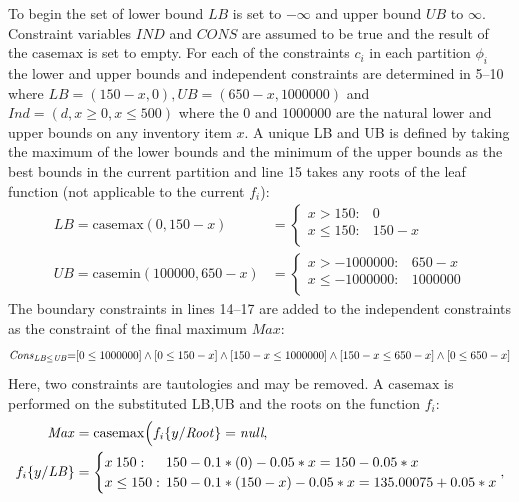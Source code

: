 \documentclass[twoside,11pt]{article}
\newcommand{\casemax}{\mathrm{casemax}}
\newcommand{\casemin}{\mathrm{casemin}}
\newcommand{\UB}{\mathit{UB}}
\newcommand{\LB}{\mathit{LB}}
\newcommand{\IND}{\mathit{Ind}}
\newcommand{\CONS}{\mathit{Cons}}
\newcommand{\Root}{\mathit{Root}}
\newcommand{\Max}{\mathit{Max}}
\newcommand{\sq}{\hspace{-1mm}}
\newcommand{\sqm}{\hspace{-2mm}}
\begin{document}
\begin{enumerate}
To begin the set of lower bound $LB$ is set to $-\infty$ and upper bound $UB$ to $\infty$. Constraint variables $IND$ and $CONS$ are assumed to be true and the result of the $\casemax$ is set to empty. 
For each of the constraints $c_i$ in each partition $\phi_i$ the lower and upper bounds and independent constraints are determined in 5--10 where $\LB = (150 - x, 0) , \UB= (650 - x, 1000000) $ and $\IND=(d,x \geq 0 , x \leq 500) $ where the $0$ and $1000000$ are the natural lower and upper bounds on any inventory item $x$.
A unique LB and UB is defined by taking the maximum of the lower bounds and the minimum of the upper bounds as the best bounds in the current partition and line 15 takes any roots of the leaf function (not applicable to the current $f_i$): 
{%
\begin{align*}
\LB = \casemax(0,150-x) & = \begin{cases}
x > 150: & 0\\ 
x \leq 150: & 150 -x \\ 
\end{cases}\\
\UB = \casemin(100000, 650-x) & = \begin{cases}
x > -1000000: & 650 -x  \\ 
x \leq -1000000: &1000000\\ 
\end{cases}
\end{align*}
}  
The boundary constraints in lines 14--17 are added to the independent constraints as the constraint of the final maximum $\mathit{Max}$:
{%
\begin{equation*}
\CONS_{\LB \leq \UB} \sq = \sq [0 \leq 1000000] \land [0 \leq 150 - x] \land [150 - x \leq 1000000] \land [150-x \leq 650 -x] \land [0 \leq 650 - x] 
\end{equation*}}
Here, two constraints are tautologies and may be removed.
A $\casemax$ is performed on the substituted LB,UB and the roots on the function $f_i$: 
{\footnotesize 
\begin{align*}
 \Max &= \casemax \Big( f_i \{ y / \Root \} = \textit{null} , \\
 f_i \{ y / \LB \} &= \begin{cases}
x \> 150: & \sqm 150 - 0.1 * (0) - 0.05 * x = 150 - 0.05 * x \\ 
x \leq 150:    & \sqm 150 - 0.1 * (150 - x ) - 0.05 * x = 135.00075 + 0.05 * x\\ 
\end{cases},\\

\end{align*}}
\end{enumerate}
\end{document}
